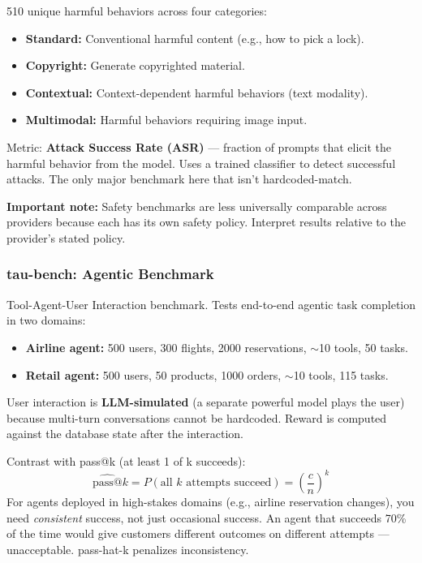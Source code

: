 \documentclass[11pt, a4paper]{article}
\begin{document}
\begin{defbox}
510 unique harmful behaviors across four categories:
\begin{itemize}[leftmargin=1.5em]
  \item \textbf{Standard:} Conventional harmful content (e.g., how to pick a lock).
  \item \textbf{Copyright:} Generate copyrighted material.
  \item \textbf{Contextual:} Context-dependent harmful behaviors (text modality).
  \item \textbf{Multimodal:} Harmful behaviors requiring image input.
\end{itemize}
Metric: \textbf{Attack Success Rate (ASR)} --- fraction of prompts that elicit the harmful behavior from the model. Uses a trained classifier to detect successful attacks. The only major benchmark here that isn't hardcoded-match.

\textbf{Important note:} Safety benchmarks are less universally comparable across providers because each has its own safety policy. Interpret results relative to the provider's stated policy.
\end{defbox}

\subsubsection{tau-bench: Agentic Benchmark}

\begin{defbox}
Tool-Agent-User Interaction benchmark. Tests end-to-end agentic task completion in two domains:
\begin{itemize}[leftmargin=1.5em]
  \item \textbf{Airline agent:} 500 users, 300 flights, 2000 reservations, $\sim$10 tools, 50 tasks.
  \item \textbf{Retail agent:} 500 users, 50 products, 1000 orders, $\sim$10 tools, 115 tasks.
\end{itemize}
User interaction is \textbf{LLM-simulated} (a separate powerful model plays the user) because multi-turn conversations cannot be hardcoded. Reward is computed against the database state after the interaction.
\end{defbox}

\begin{defbox}
Contrast with pass@k (at least 1 of k succeeds):
\[
\widehat{\text{pass@}}k = P(\text{all } k \text{ attempts succeed}) = \left(\frac{c}{n}\right)^k
\]
For agents deployed in high-stakes domains (e.g., airline reservation changes), you need \emph{consistent} success, not just occasional success. An agent that succeeds 70\% of the time would give customers different outcomes on different attempts --- unacceptable. pass-hat-k penalizes inconsistency.
\end{defbox}
\end{document}
